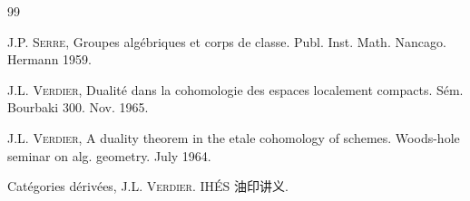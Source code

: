 \begin{thebibliography}{99}

 J.P. \textsc{Serre}, Groupes algébriques et corps de
classe. Publ. Inst. Math. Nancago. Hermann 1959.

 J.L. \textsc{Verdier}, Dualité dans la cohomologie des espaces
localement compacts. Sém. Bourbaki 300. Nov. 1965.

 J.L. \textsc{Verdier}, A duality theorem in the etale
  cohomology of schemes. Woods-hole seminar on alg. geometry. July 1964.

 Catégories dérivées, J.L. \textsc{Verdier}. IHÉS 油印讲义.

\end{thebibliography}


\ifx\danslelivre\undefined
\let\SGAXVIIIenddocument\enddocument
\else
\let\SGAXVIIIenddocument\relax
\fi
\SGAXVIIIenddocument


